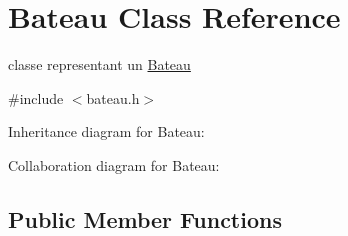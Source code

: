 \hypertarget{class_bateau}{}\section{Bateau Class Reference}
\label{class_bateau}


classe representant un \hyperlink{class_bateau}{Bateau}  




{\ttfamily \#include $<$bateau.\+h$>$}



Inheritance diagram for Bateau\+:


Collaboration diagram for Bateau\+:
\subsection*{Public Member Functions}
